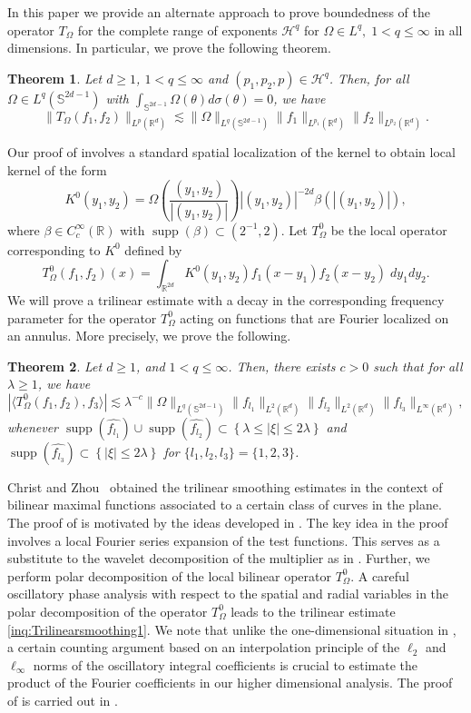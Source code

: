 \documentclass[a4paper,reqno]{amsart}
\newcommand{\R}{{\mathbb R}}       %
\newcommand{\Sp}{{\mathbb S}}
\newcommand{\supp}[1]{\operatorname{supp}(#1)}   %
\newtheorem{theorem}{Theorem}[section]
\theoremstyle{definition}
\numberwithin{equation}{section}
\begin{document}
In this paper we provide an alternate approach to prove boundedness of the operator $T_\Omega$ for the complete range of exponents $\mathcal{H}^q$ for $\Omega\in L^q,\;1<q\leq\infty$ in all dimensions. In particular, we prove the following theorem.
\begin{theorem}\label{Thm:Rough}
	Let $d\geq1$, $1<q\leq\infty$ and $(p_1,p_2,p)\in\mathcal{H}^q$. Then, for all $\Omega\in L^q(\Sp^{2d-1})$ with $\int_{\Sp^{2d-1}}\Omega(\theta) d\sigma(\theta)=0$, we have
	\[\|T_\Omega(f_1,f_2)\|_{L^p(\R^d)}\lesssim\|\Omega\|_{L^q(\Sp^{2d-1})}\|f_1\|_{L^{p_1}(\R^d)}\|f_2\|_{L^{p_2}(\R^d)}.\]
\end{theorem}
Our proof of  involves a standard spatial localization of the kernel to obtain local kernel of the form
\[K^0(y_1,y_2)=\Omega\left(\frac{(y_1,y_2)}{|(y_1,y_2)|}\right){|(y_1,y_2)|^{-2d}}\beta(|(y_1,y_2)|),\]
where $\beta\in C_c^\infty(\R)$ with $\supp{\beta}\subset(2^{-1},2)$. Let $T^0_\Omega$ be the local operator corresponding to $K^0$ defined by
\[T^0_\Omega(f_1,f_2)(x)=\int_{\R^{2d}}K^0(y_1,y_2)f_1(x-y_1)f_2(x-y_2)\;dy_1dy_2.\]
We will prove a trilinear estimate with a decay in the corresponding frequency parameter for the operator $T_\Omega^0$ acting on functions that are Fourier localized on an annulus. More precisely, we prove the following.
\begin{theorem}\label{thm:Smoothing}
	Let $d\geq1$, and $1<q\leq\infty$. Then, there exists $c>0$ such that for all $\lambda\geq1$, we have
		\begin{equation}\label{inq:Trilinearsmoothing1}
			|\langle T^0_\Omega(f_1,f_2),f_3\rangle|\lesssim\lambda^{-c}\|\Omega\|_{L^q(\Sp^{2d-1})}\|f_{l_1}\|_{L^{2}(\R^d)}\|f_{l_2}\|_{L^{2}(\R^d)}\|f_{l_3}\|_{L^{\infty}(\R^d)},
		\end{equation}
	whenever $\supp{\widehat{f_{l_1}}}\cup\supp{\widehat{f_{l_2}}}\subset\left\{\lambda\leq|\xi|\leq2\lambda\right\}$ and $\supp{\widehat{f_{l_3}}}\subset\left\{|\xi|\leq2\lambda\right\}$ for $\{l_1,l_2,l_3\}=\{1,2,3\}$.
\end{theorem}
Christ and Zhou~\cite{ChristZhou} obtained the trilinear smoothing estimates in the context of bilinear maximal functions associated to a certain class of curves in the plane. The proof of  is motivated by the  ideas developed in \cite{ChristZhou}. The key idea  in the proof involves a local Fourier series expansion of the test functions. This serves as a substitute to the wavelet decomposition of the multiplier as in \cite{GHH2018}. Further, we perform polar decomposition of the local bilinear operator $T_\Omega^0$. A careful oscillatory phase analysis with respect to the spatial and radial variables in the polar decomposition of the operator $T_\Omega^0$ leads to the trilinear estimate \eqref{inq:Trilinearsmoothing1}. We note that unlike the one-dimensional situation in \cite{ChristZhou}, a certain counting argument based on an interpolation principle of the $\ell_2$ and $\ell_\infty$ norms of the oscillatory integral coefficients is crucial to estimate the product of the Fourier coefficients in our higher dimensional analysis. The proof of  is carried out in .
\end{document}
